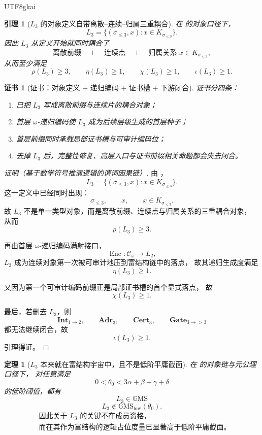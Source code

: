 \documentclass[12pt]{article}
\newtheorem{theorem}{定理}[section]
\newtheorem{lemma}{引理}[section]
\newtheorem{Certificate}{证书}[section]
\newcommand{\GMS}{\mathbb{G}\mathrm{MS}}
\begin{document}
\begin{CJK*}{UTF8}{gkai}
\begin{lemma}[\(L_3\) 的对象定义自带离散--连续--归属三重耦合]
\label{lem:tex1-ch12-coupled}
在 \cite{RepoTex41HomotopyRepairBundle} 的对象口径下，
\[
  L_3
  =
  \{(\sigma_{\le 3},x):x\in K_{\sigma_{\le 3}}\}.
\]
因此 \(L_3\) 从定义开始就同时耦合了
\[
  \text{离散前缀}\quad+\quad \text{连续点}\quad+\quad \text{归属关系 }x\in K_{\sigma_{\le3}},
\]
从而至少满足
\[
  \rho(L_3)\ge 3,\qquad
  \eta(L_3)\ge 1,\qquad
  \chi(L_3)\ge 1,\qquad
  \iota(L_3)\ge 1.
\]
\end{lemma}

\begin{Certificate}[证书：对象定义 + 递归编码 + 证书槽 + 下游闭合]
\label{cert:tex1-ch12-coupled}
证书分四条：
\begin{enumerate}
  \item \cite{RepoTex41HomotopyRepairBundle} 已把 \(L_3\) 写成离散前缀与连续片的耦合对象；
  \item 首层 \(\omega\)-递归编码使 \(L_3\) 成为后续层级生成的首层种子；
  \item 首层前缀同时承载局部证书槽与可审计编码位；
  \item 去掉 \(L_3\) 后，完整性修复、高层入口与证书前缀相关命题都会失去闭合。
\end{enumerate}
\end{Certificate}

\begin{proof}[证明（基于数学符号推演逻辑的谓词因果链）]
由 \cite{RepoTex41HomotopyRepairBundle}，
\[
  L_3
  =
  \{(\sigma_{\le 3},x):x\in K_{\sigma_{\le 3}}\}.
\]
这一定义中已经同时出现：
\[
  \sigma_{\le 3},
  \qquad
  x,
  \qquad
  x\in K_{\sigma_{\le 3}}.
\]
故 \(L_3\) 不是单一类型对象，而是离散前缀、连续点与归属关系的三重耦合对象，
从而
\[
  \rho(L_3)\ge 3.
\]

再由首层 \(\omega\)-递归编码满射接口，
\[
  \operatorname{Enc}:\mathcal C_\omega\to L_2,
\]
\(L_3\) 成为连续对象第一次被可审计地压到富结构链中的落点，
故其递归生成度满足
\[
  \eta(L_3)\ge 1.
\]

又因为第一个可审计编码前缀正是局部证书槽的首个显式落点，
故
\[
  \chi(L_3)\ge 1.
\]

最后，若删去 \(L_3\)，则
\[
  \mathbf{Int}_{1\to2},\qquad
  \mathbf{Adr}_3,\qquad
  \mathbf{Cert}_3,\qquad
  \mathbf{Gate}_{3\to >3}
\]
都无法继续闭合，故
\[
  \iota(L_3)\ge 1.
\]
引理得证。
\end{proof}

\begin{theorem}[\(L_3\) 本来就在富结构宇宙中，且不是低阶平庸截面]
\label{thm:tex1-ch12-gms}
在 \cite{RepoTex41HomotopyRepairBundle,RepoMetaGMSAxiom} 的对象链与元公理口径下，
对任意满足
\[
  0<\theta_0<3\alpha+\beta+\gamma+\delta
\]
的低阶阈值，都有
\[
  \boxed{
    L_3\in \GMS
  }
\]
\[
  \boxed{
    L_3\notin \GMS_{\mathrm{low}}(\theta_0).
  }
\]
\[
  \boxed{
    \begin{aligned}
      &\text{因此关于 }L_3\text{ 的关键不在成员资格，}\\
      &\text{而在其作为富结构的逻辑占位度量已显著高于低阶平庸截面。}
    \end{aligned}
  }
\]
\end{theorem}


\end{CJK*}
\end{document}
